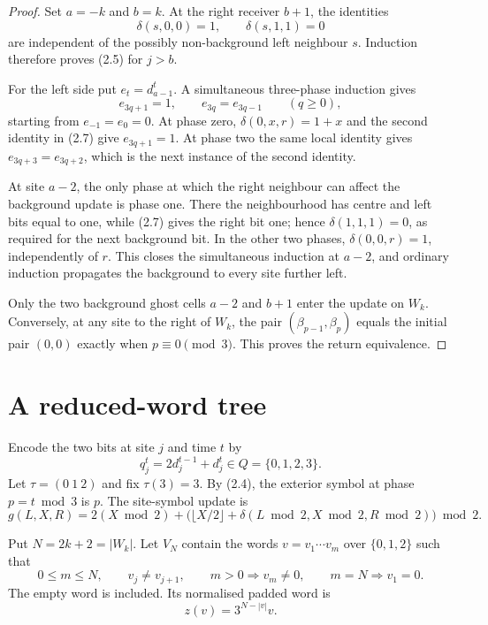 \documentclass[11pt]{amsart}
\theoremstyle{definition}
\begin{document}
\begin{proof}
Set \(a=-k\) and \(b=k\).  At the right receiver \(b+1\), the identities
\[
\delta(s,0,0)=1,\qquad \delta(s,1,1)=0
\]
are independent of the possibly non-background left neighbour \(s\).
Induction therefore proves (2.5) for \(j>b\).

For the left side put \(e_t=d^t_{a-1}\).  A simultaneous three-phase
induction gives
\[
e_{3q+1}=1,\qquad e_{3q}=e_{3q-1}\qquad(q\geq0),      \tag{2.7}
\]
starting from \(e_{-1}=e_0=0\).  At phase zero,
\(\delta(0,x,r)=1+x\) and the second identity in (2.7) give
\(e_{3q+1}=1\).  At phase two the same local identity gives
\(e_{3q+3}=e_{3q+2}\), which is the next instance of the second identity.

At site \(a-2\), the only phase at which the right neighbour can affect the
background update is phase one.  There the neighbourhood has centre and left
bits equal to one, while (2.7) gives the right bit one; hence
\(\delta(1,1,1)=0\), as required for the next background bit.  In the other
two phases, \(\delta(0,0,r)=1\), independently of \(r\).  This closes the
simultaneous induction at \(a-2\), and ordinary induction propagates the
background to every site further left.

Only the two background ghost cells \(a-2\) and \(b+1\) enter the update on
\(W_k\).  Conversely, at any site to the right of \(W_k\), the pair
\((\beta_{p-1},\beta_p)\) equals the initial pair \((0,0)\) exactly when
\(p\equiv0\pmod3\).  This proves the return equivalence.
\end{proof}

\section{A reduced-word tree}

Encode the two bits at site \(j\) and time \(t\) by
\[
q^t_j=2d^{t-1}_j+d^t_j\in Q=\{0,1,2,3\}.             \tag{3.1}
\]
Let \(\tau=(0\ 1\ 2)\) and fix \(\tau(3)=3\).  By (2.4), the exterior
symbol at phase \(p=t\bmod3\) is \(p\).  The site-symbol update is
\[
g(L,X,R)=2(X\bmod2)+
 \bigl(\lfloor X/2\rfloor+
 \delta(L\bmod2,X\bmod2,R\bmod2)\bigr)\bmod2.       \tag{3.2}
\]

Put \(N=2k+2=|W_k|\).  Let \(V_N\) contain the words
\(v=v_1\cdots v_m\) over \(\{0,1,2\}\) such that
\[
0\leq m\leq N,\qquad v_j\neq v_{j+1},\qquad
m>0\Rightarrow v_m\neq0,\qquad
m=N\Rightarrow v_1=0.                                \tag{3.3}
\]
The empty word is included.  Its normalised padded word is
\[
z(v)=3^{N-|v|}v.                                      \tag{3.4}
\]
\end{document}
